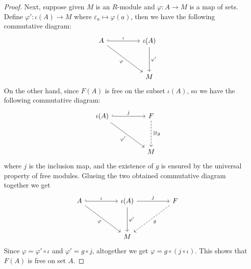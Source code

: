 \begin{proof}
    Next, suppose given $M$ is an $R$-module and $\varphi:A\to M$ is a map of sets. Define $\varphi':\iota(A)\to M$ where $\varepsilon_a\mapsto \varphi(a)$, then we have the following commutative diagram:
    \[\begin{tikzcd}
	   A && \iota(A) \\
	   \\
	   && M
	   \arrow["\iota", hook, from=1-1, to=1-3]
	   \arrow["\varphi"', from=1-1, to=3-3]
	   \arrow["{\varphi'}", from=1-3, to=3-3]
    \end{tikzcd}\]
    On the other hand, since $F(A)$ is free on the subset $\iota(A)$, so we have the following commutative diagram:
    \[\begin{tikzcd}
	   \iota(A) && F \\
	   \\
	   && M
	   \arrow["j", hook, from=1-1, to=1-3]
	   \arrow["\varphi'"', from=1-1, to=3-3]
	   \arrow["{\exists! g}", dashed, from=1-3, to=3-3]
    \end{tikzcd}\]
    where $j$ is the inclusion map, and the existence of $g$ is ensured by the universal property of free modules. Glueing the two obtained commutative diagram together we get
    \[\begin{tikzcd}
	   A && \iota(A) && F\\
	   \\
	   && M
	   \arrow["\iota", hook, from=1-1, to=1-3]
	   \arrow["\varphi"', from=1-1, to=3-3]
	   \arrow["{\varphi'}", from=1-3, to=3-3]
       \arrow["j", from=1-3, to=1-5]
       \arrow["g", dashed, from=1-5, to=3-3]
    \end{tikzcd}\]
    Since $\varphi = \varphi'\circ \iota$ and $\varphi' = g\circ j$, altogether we get $\varphi = g \circ (j\circ \iota)$. This shows that $F(A)$ is free on set $A$.
\end{proof}

